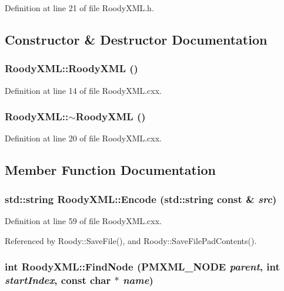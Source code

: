 Definition at line 21 of file RoodyXML.h.

\subsection{Constructor \& Destructor Documentation}
\subsubsection[{RoodyXML}]{\setlength{\rightskip}{0pt plus 5cm}RoodyXML::RoodyXML ()}\label{classRoodyXML_a45196cf57756539b0df4aa1dfcb6b870}


Definition at line 14 of file RoodyXML.cxx.
\subsubsection[{$\sim$RoodyXML}]{\setlength{\rightskip}{0pt plus 5cm}RoodyXML::$\sim$RoodyXML ()\hspace{0.3cm}{\ttfamily  [virtual]}}\label{classRoodyXML_a59ecb5a22b03435e71e8d849ec4d4737}


Definition at line 20 of file RoodyXML.cxx.

\subsection{Member Function Documentation}
\subsubsection[{Encode}]{\setlength{\rightskip}{0pt plus 5cm}std::string RoodyXML::Encode (std::string const \& {\em src})}\label{classRoodyXML_a66543ef610fb926e36272cf8763bf0d5}


Definition at line 59 of file RoodyXML.cxx.

Referenced by Roody::SaveFile(), and Roody::SaveFilePadContents().
\subsubsection[{FindNode}]{\setlength{\rightskip}{0pt plus 5cm}int RoodyXML::FindNode ({\bf PMXML\_\-NODE} {\em parent}, \/  int {\em startIndex}, \/  const char $\ast$ {\em name})}\label{classRoodyXML_aa3cf4e18c5af01966be251c946f586ab}


